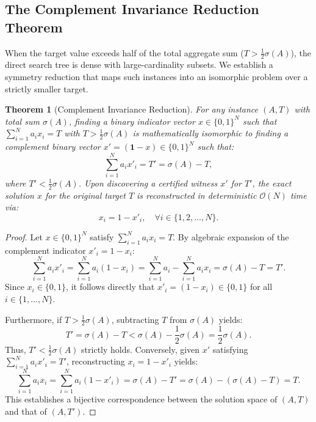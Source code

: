 \documentclass[journal,onecolumn,11pt]{IEEEtran}
\newtheorem{theorem}{Theorem}
\begin{document}
\subsection{The Complement Invariance Reduction Theorem}
When the target value exceeds half of the total aggregate sum ($T > \frac{1}{2}\sigma(A)$), the direct search tree is dense with large-cardinality subsets. We establish a symmetry reduction that maps such instances into an isomorphic problem over a strictly smaller target.

\begin{theorem}[Complement Invariance Reduction]
\label{thm:complement}
For any instance $(A, T)$ with total sum $\sigma(A)$, finding a binary indicator vector $x \in \{0, 1\}^N$ such that $\sum_{i=1}^N a_i x_i = T$ with $T > \frac{1}{2}\sigma(A)$ is mathematically isomorphic to finding a complement binary vector $x' = (\mathbf{1} - x) \in \{0, 1\}^N$ such that:
\begin{equation}
    \sum_{i=1}^N a_i x'_i = T' = \sigma(A) - T,
\end{equation}
where $T' < \frac{1}{2}\sigma(A)$. Upon discovering a certified witness $x'$ for $T'$, the exact solution $x$ for the original target $T$ is reconstructed in deterministic $\mathcal{O}(N)$ time via:
\begin{equation}
    x_i = 1 - x'_i, \quad \forall i \in \{1, 2, \dots, N\}.
\end{equation}
\end{theorem}
\begin{proof}
Let $x \in \{0, 1\}^N$ satisfy $\sum_{i=1}^N a_i x_i = T$. By algebraic expansion of the complement indicator $x'_i = 1 - x_i$:
\begin{equation}
    \sum_{i=1}^N a_i x'_i = \sum_{i=1}^N a_i (1 - x_i) = \sum_{i=1}^N a_i - \sum_{i=1}^N a_i x_i = \sigma(A) - T = T'.
\end{equation}
Since $x_i \in \{0, 1\}$, it follows directly that $x'_i = (1 - x_i) \in \{0, 1\}$ for all $i \in \{1, \dots, N\}$. 

Furthermore, if $T > \frac{1}{2}\sigma(A)$, subtracting $T$ from $\sigma(A)$ yields:
\begin{equation}
    T' = \sigma(A) - T < \sigma(A) - \frac{1}{2}\sigma(A) = \frac{1}{2}\sigma(A).
\end{equation}
Thus, $T' < \frac{1}{2}\sigma(A)$ strictly holds. Conversely, given $x'$ satisfying $\sum_{i=1}^N a_i x'_i = T'$, reconstructing $x_i = 1 - x'_i$ yields:
\begin{equation}
    \sum_{i=1}^N a_i x_i = \sum_{i=1}^N a_i (1 - x'_i) = \sigma(A) - T' = \sigma(A) - (\sigma(A) - T) = T.
\end{equation}
This establishes a bijective correspondence between the solution space of $(A, T)$ and that of $(A, T')$.
\end{proof}
\end{document}
